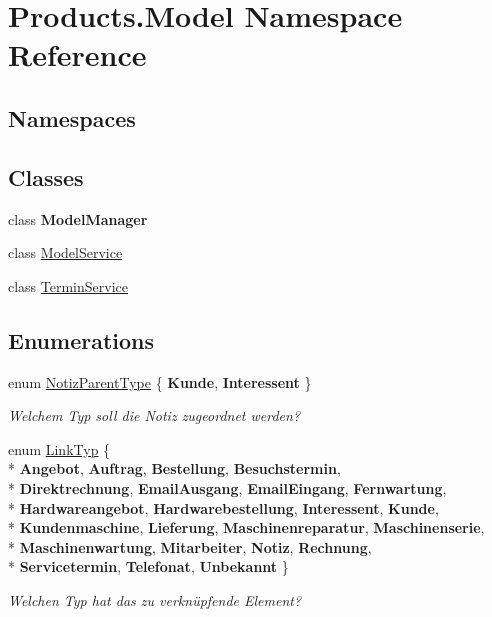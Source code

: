 \hypertarget{namespace_products_1_1_model}{}\section{Products.\+Model Namespace Reference}
\label{namespace_products_1_1_model}
\subsection*{Namespaces}
\begin{DoxyCompactItemize}
\end{DoxyCompactItemize}
\subsection*{Classes}
\begin{DoxyCompactItemize}
\item 
class {\bfseries Model\+Manager}
\item 
class \hyperlink{class_products_1_1_model_1_1_model_service}{Model\+Service}
\item 
class \hyperlink{class_products_1_1_model_1_1_termin_service}{Termin\+Service}
\end{DoxyCompactItemize}
\subsection*{Enumerations}
\begin{DoxyCompactItemize}
\item 
enum \hyperlink{namespace_products_1_1_model_aa53a12ac8a17bed12c76a466aeeba94d}{Notiz\+Parent\+Type} \{ {\bfseries Kunde}, 
{\bfseries Interessent}
 \}\begin{DoxyCompactList}\small\item\em Welchem Typ soll die Notiz zugeordnet werden? \end{DoxyCompactList}
\item 
enum \hyperlink{namespace_products_1_1_model_a0ea8a130b9a610541b442971b91cbc31}{Link\+Typ} \{ \\*
{\bfseries Angebot}, 
{\bfseries Auftrag}, 
{\bfseries Bestellung}, 
{\bfseries Besuchstermin}, 
\\*
{\bfseries Direktrechnung}, 
{\bfseries Email\+Ausgang}, 
{\bfseries Email\+Eingang}, 
{\bfseries Fernwartung}, 
\\*
{\bfseries Hardwareangebot}, 
{\bfseries Hardwarebestellung}, 
{\bfseries Interessent}, 
{\bfseries Kunde}, 
\\*
{\bfseries Kundenmaschine}, 
{\bfseries Lieferung}, 
{\bfseries Maschinenreparatur}, 
{\bfseries Maschinenserie}, 
\\*
{\bfseries Maschinenwartung}, 
{\bfseries Mitarbeiter}, 
{\bfseries Notiz}, 
{\bfseries Rechnung}, 
\\*
{\bfseries Servicetermin}, 
{\bfseries Telefonat}, 
{\bfseries Unbekannt}
 \}\begin{DoxyCompactList}\small\item\em Welchen Typ hat das zu verknüpfende Element? \end{DoxyCompactList}
\end{DoxyCompactItemize}


